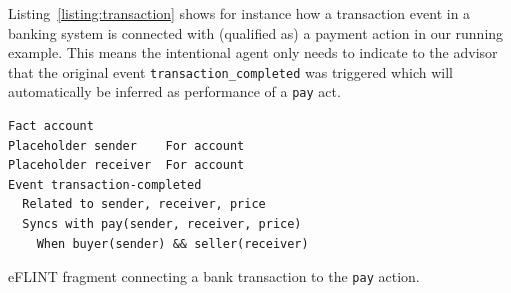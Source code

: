 %
%
%
Listing~\ref{listing:transaction} shows for instance how a transaction event in a banking system is connected with (qualified as) a payment action in our running example. This means the intentional agent only needs to indicate to the advisor that the original event \texttt{transaction_completed} was triggered which will automatically be inferred as performance of a \texttt{pay} act.

\begin{listing}[t]
\centering
\begin{tcolorbox}[left=2pt,right=2pt,top=2pt,bottom=2pt]
\begin{verbatim}
Fact account
Placeholder sender    For account
Placeholder receiver  For account
Event transaction-completed 
  Related to sender, receiver, price 
  Syncs with pay(sender, receiver, price) 
    When buyer(sender) && seller(receiver) 
\end{verbatim}
\end{tcolorbox}
\caption{eFLINT fragment connecting a bank transaction to the \texttt{pay} action.}
\label{listing:transaction}
\vspace{-5pt}\end{listing}

%
%
%

